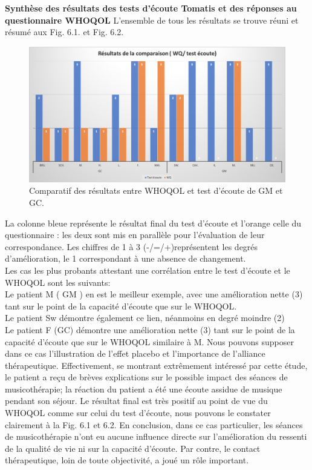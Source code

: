  
    \textbf{ Synthèse  des résultats  des tests d'écoute Tomatis et des réponses au questionnaire 
    WHOQOL}
     L'ensemble de tous les résultats se trouve réuni et résumé
    aux Fig. 6.1. et Fig. 6.2.
    \begin{figure}
    	\centering
    	\includegraphics[width=0.7\columnwidth]{images/graphiques/comparatifWQecoute.png}
    	\caption[Comparatif résultats pré/post]{Comparatif des résultats entre WHOQOL et test d'écoute de  
    	GM et GC.}
    \end{figure}
    \clearpage
    La colonne bleue représente le résultat final 
    du test d'écoute et l'orange celle du questionnaire : les deux sont mis en parallèle 
    pour l'évaluation de leur correspondance. Les chiffres de 1 à 3 (-/=/+)représentent les degrés 
    d'amélioration, le 1 
    correspondant à une absence de changement.
    \\ 
    Les cas les plus probants attestant une corrélation entre le test d'écoute et le WHOQOL sont les 
    suivants: 
  \\
  Le patient M ( GM ) en est le meilleur exemple, avec une amélioration nette (3) tant sur le point 
  de la capacité d'écoute que sur le WHOQOL.
   \\
  Le patient Sw démontre également ce lien, néanmoins en degré moindre (2)
   \\
Le patient F (GC) démontre une amélioration nette (3) tant sur le point 
 de la capacité d'écoute que sur le WHOQOL similaire à M.
  Nous pouvons supposer dans ce cas l'illustration de  l'effet placebo et l'importance de  
  l'alliance 
  thérapeutique. Effectivement, se montrant extrêmement intéressé  par cette étude, le patient a 
  reçu de brèves explications 
  sur le possible impact des séances de musicothérapie; la réaction du patient 
  a été une écoute assidue de musique  pendant son séjour. Le résultat final est très positif au point de 
  vue du WHOQOL comme sur celui du test 
  d'écoute, nous pouvons le constater clairement  à la 
  Fig. 6.1 et 6.2.  En conclusion, dans ce cas particulier, les séances de musicothérapie n'ont eu aucune  
  influence directe sur 
  l'amélioration du ressenti de la qualité de vie ni sur la capacité d'écoute. Par contre, le contact 
  thérapeutique, loin de toute objectivité, a joué un rôle important.
  
